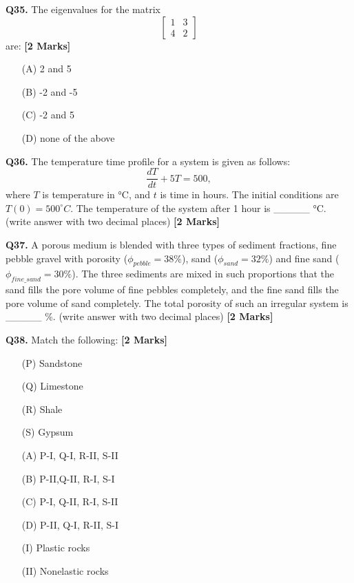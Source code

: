 \documentclass[11pt]{article}
\newcommand{\questionb}[2]{
    \noindent\textbf{Q#2.} #1 \hfill \textbf{[2 Marks]}
}
\begin{document}
\questionb{The eigenvalues for the matrix 
\[\begin{bmatrix}
1 & 3 \\
4 & 2
\end{bmatrix}\]
are:}{35}
\begin{enumerate}
    \item[(A)] 2 and 5
    \item[(B)] -2 and -5
    \item[(C)] -2 and 5
    \item[(D)] none of the above
\end{enumerate}
\vspace{0.5cm}

\questionb{The temperature time profile for a system is given as follows:
\[\frac{dT}{dt} + 5T = 500,\]
where \(T\) is temperature in °C, and \(t\) is time in hours. The initial conditions are \(T(0) = 500^\circ C\). The temperature of the system after 1 hour is \_\_\_\_\_ °C. (write answer with two decimal places)}{36}
\vspace{0.5cm}

\questionb{A porous medium is blended with three types of sediment fractions, fine pebble gravel with porosity (\(\phi_{pebble} = 38\%\)), sand (\(\phi_{sand} = 32\%\)) and fine sand (\(\phi_{fine\_sand} = 30\%\)). The three sediments are mixed in such proportions that the sand fills the pore volume of fine pebbles completely, and the fine sand fills the pore volume of sand completely. The total porosity of such an irregular system is \_\_\_\_\_ \%. (write answer with two decimal places)}{37}
\vspace{0.5cm}

\questionb{Match the following:}{38}
\begin{enumerate}
    \item[(P)] Sandstone
    \item[(Q)] Limestone
    \item[(R)] Shale
    \item[(S)] Gypsum
    \item[(A)] P-I, Q-I, R-II, S-II
    \item[(B)] P-II,Q-II, R-I, S-I
    \item[(C)] P-I, Q-II, R-I, S-II
    \item[(D)] P-II, Q-I, R-II, S-I
    \item[(I)] Plastic rocks
    \item[(II)] Nonelastic rocks
\end{enumerate}
\vspace{0.5cm}
\end{document}
